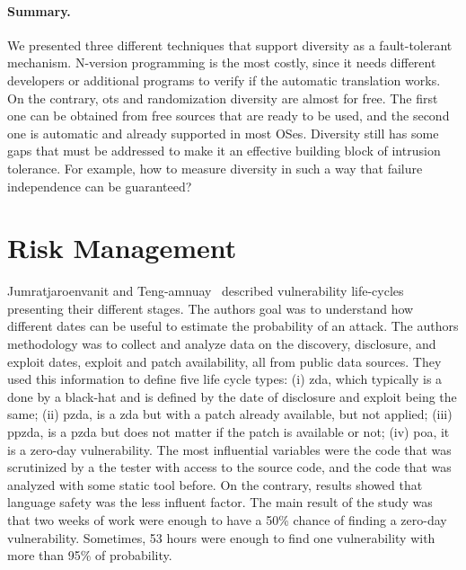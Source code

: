 \paragraph{Summary.}
We presented three different techniques that support diversity as a fault-tolerant mechanism. 
N-version programming is the most costly, since it needs different developers or additional programs to verify if the automatic translation works. 
On the contrary, \gls{ots} and randomization diversity are almost for free. 
The first one can be obtained from free sources that are ready to be used, and the second one is automatic and already supported
in most OSes. 
Diversity still has some gaps that must be addressed to make it an effective building block of intrusion tolerance. 
For example, how to measure diversity in such a way that failure independence can be guaranteed?



\section{Risk Management}

Jumratjaroenvanit and Teng-amnuay~\cite{Jumratjaroenvanit:2008} described vulnerability life-cycles presenting their different stages. 
The authors goal was to understand how different dates can be useful to estimate the probability of an attack. 
The authors methodology was to collect and analyze data on the discovery, disclosure, and exploit dates, exploit and patch availability, all from public data sources. 
They used this information to define five life cycle types: (i) \gls{zda}, which typically is a done by a black-hat and is defined by the date of disclosure and exploit being the same; (ii) \gls{pzda}, is a \gls{zda} but with a patch already available, but not applied; 
(iii) \gls{ppzda}, is a \gls{pzda} but does not matter if the patch is available or not; 
(iv) \gls{poa}, it is a zero-day vulnerability. 
The most influential variables were the code that was scrutinized by a the tester with access to the source code, and the code that was analyzed with some static tool before. 
On the contrary, results showed that language safety was the less influent factor. 
The main result of the study was that two weeks of work were enough to have a 50\% chance of finding a zero-day vulnerability. 
Sometimes, 53 hours were enough to find one vulnerability with more than 95\% of probability.


